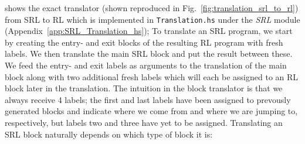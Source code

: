 \cite[Fig.~21]{REV} shows the exact translator (shown reproduced in Fig.~\ref{fig:translation_srl_to_rl}) from SRL to RL which is implemented in \texttt{Translation.hs} under the \textit{SRL} module (Appendix~\ref{app:SRL_Translation_hs}); To translate an SRL program, we start by creating the entry- and exit blocks of the resulting RL program with fresh labels. We then translate the main SRL block and put the result between these. We feed the entry- and exit labels as arguments to the translation of the main block along with two additional fresh labels which will each be assigned to an RL block later in the translation. The intuition in the block translator is that we always receive 4 labels; the first and last labels have been assigned to prevously generated blocks and indicate where we come from and where we are jumping to, respectively, but labels two and three have yet to be assigned. Translating an SRL block naturally depends on which type of block it is:
